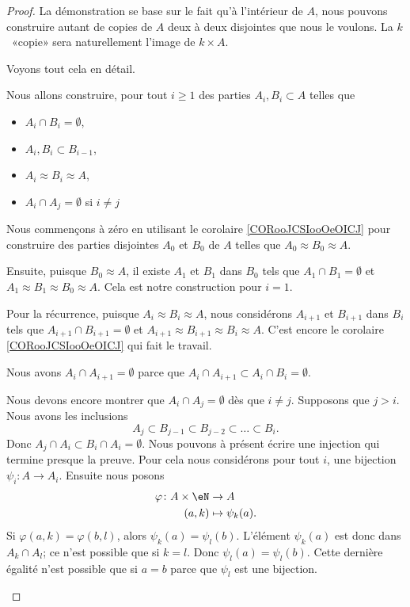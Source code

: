 \begin{proof}
	La démonstration se base sur le fait qu'à l'intérieur de \( A\), nous pouvons construire autant de copies de \( A\) deux à deux disjointes que nous le voulons. La \( k\)\ieme\ «copie» sera naturellement l'image de \( k\times A\).

	Voyons tout cela en détail.
	\begin{subproof}
		Nous allons construire, pour tout \( i\geq 1 \) des parties \( A_i,B_i\subset A\) telles que
		\begin{itemize}
			\item \( A_i\cap B_i=\emptyset\),
			\item \( A_i,B_i\subset B_{i-1}\),
			\item \( A_i\approx B_i\approx A\),
			\item \( A_i\cap A_j=\emptyset\) si \( i\neq j\)
		\end{itemize}
		\spitem[La construction]
		Nous commençons à zéro en utilisant le corolaire \ref{CORooJCSIooOeOICJ} pour construire des parties disjointes \( A_0\) et \( B_0\) de \( A\) telles que \( A_0\approx B_0\approx A\).

		Ensuite, puisque \( B_0\approx A\), il existe \( A_1\) et \( B_1\) dans \( B_0\) tels que \(  A_1\cap B_1=\emptyset\) et \( A_1\approx B_1\approx B_0\approx A\). Cela est notre construction pour \( i=1\).

		Pour la récurrence, puisque \( A_i\approx B_i\approx A\), nous considérons \( A_{i+1}\) et \( B_{i+1}\) dans \( B_i\) tels que \( A_{i+1}\cap B_{i+1}=\emptyset\) et \( A_{i+1}\approx B_{i+1}\approx B_i\approx A\). C'est encore le corolaire \ref{CORooJCSIooOeOICJ} qui fait le travail.

		Nous avons \( A_i\cap A_{i+1}=\emptyset\) parce que \( A_i\cap A_{i+1}\subset A_i\cap B_i=\emptyset\).

		Nous devons encore montrer que \( A_i\cap A_j=\emptyset\) dès que \( i\neq j\). Supposons que \( j>i\). Nous avons les inclusions
		\begin{equation}
			A_j\subset B_{j-1}\subset B_{j-2}\subset \ldots \subset B_i.
		\end{equation}
		Donc \( A_j\cap A_i\subset B_i\cap A_i=\emptyset\).
		Nous pouvons à présent écrire une injection qui termine presque la preuve. Pour cela nous considérons pour tout \( i\), une bijection \( \psi_i\colon A\to A_i\). Ensuite nous posons
		\begin{equation}
			\begin{aligned}
				\varphi\colon A\times \eN & \to A              \\
				(a,k)                     & \mapsto \psi_k(a).
			\end{aligned}
		\end{equation}
		Si \( \varphi(a,k)=\varphi(b,l)\), alors \( \psi_k(a)=\psi_l(b)\). L'élément \( \psi_k(a)\) est donc dans \( A_k\cap A_l\); ce n'est possible que si \( k=l\). Donc \( \psi_l(a)=\psi_l(b)\). Cette dernière égalité n'est possible que si \( a=b\) parce que \( \psi_l\) est une bijection.


\end{subproof}
\end{proof}
